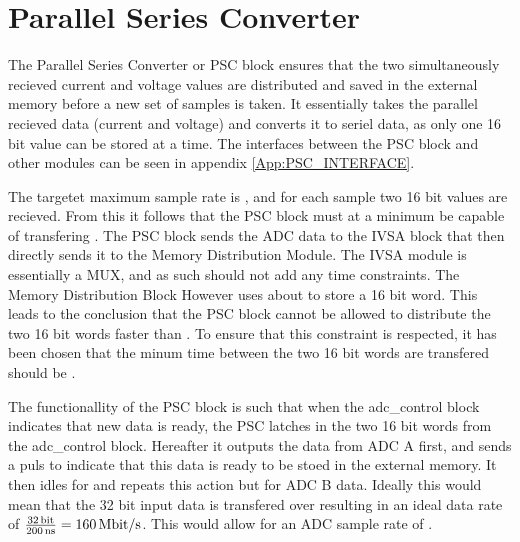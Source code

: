 \section{Parallel Series Converter} \label{subsec:PSC}
The Parallel Series Converter or PSC block ensures that the two simultaneously recieved current and voltage values are distributed and saved in the external memory before a new set of samples is taken. It essentially takes the parallel recieved data (current and voltage) and converts it to seriel data, as only one 16 bit value can be stored at a time. The interfaces between the PSC block and other modules can be seen in appendix \ref{App:PSC_INTERFACE}.

The targetet maximum sample rate is , and for each sample two 16 bit values are recieved. From this it follows that the PSC block must at a minimum be capable of transfering . The PSC block sends the ADC data to the IVSA block that then directly sends it to the Memory Distribution Module. The IVSA module is essentially a MUX, and as such should not add any time constraints. The Memory Distribution Block However uses about  to store a 16 bit word. This leads to the conclusion that the PSC block cannot be allowed to distribute the two 16 bit words faster than . To ensure that this constraint is respected, it has been chosen that the minum time between the two 16 bit words are transfered should be .

The functionallity of the PSC block is such that when the adc\_control block indicates that new data is ready, the PSC latches in the two 16 bit words from the adc\_control block. Hereafter it outputs the data from ADC A first, and sends a puls to indicate that this data is ready to be stoed in the external memory. It then idles for  and repeats this action but for ADC B data. Ideally this would mean that the 32 bit input data is transfered over  resulting in an ideal data rate of $\frac{\SIQ{32}{\bit}}{\SIQ{200}{\nano\second}} = \SIQ{160}{\mega\bit/\second}$. This would allow for an ADC sample rate of .

